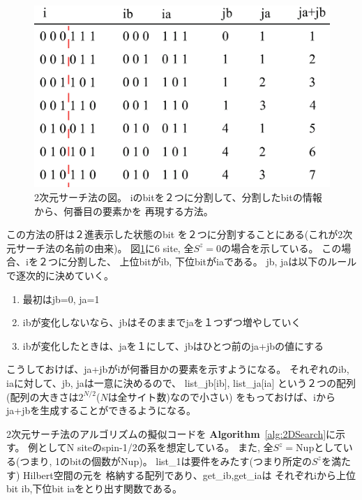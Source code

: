 \documentclass[prb,aps,showpacs,preprint,nofootinbib]{revtex4}
\begin{document}
\begin{figure}[h!]
        \begin{center}
                \includegraphics[width=12cm,clip]{2DSearch.eps}
        \end{center}
\caption{2次元サーチ法の図。
iのbitを２つに分割して、分割したbitの情報から、何番目の要素かを
再現する方法。}
\label{fig:2DSearch}
\end{figure}


この方法の肝は２進表示した状態のbit
を２つに分割することにある(これが2次元サーチ法の名前の由来)。
図\ref{fig:2DSearch}に6 site, 全$S^{z}=0$の場合を示している。
この場合、iを２つに分割した、
上位bitがib, 下位bitがiaである。
jb, jaは以下のルールで逐次的に決めていく。
\begin{enumerate}
\item 最初はjb=0, ja=1
\item ibが変化しないなら、jbはそのままでjaを１つずつ増やしていく
\item ibが変化したときは、jaを１にして、jbはひとつ前のja+jbの値にする
\end{enumerate}
こうしておけば、ja+jbがiが何番目かの要素を示すようになる。
それぞれのib, iaに対して、jb, jaは一意に決めるので、
list\_jb[ib], list\_ja[ia]
という２つの配列(配列の大きさは$2^{N/2}$($N$は全サイト数)なので小さい)
をもっておけば、iからja+jbを生成することができるようになる。

2次元サーチ法のアルゴリズムの擬似コードを
{\bf Algorithm}~\ref{alg:2DSearch}に示す。
例としてN siteのspin-1/2の系を想定している。
また, 全$S^z=$Nupとしている(つまり, 1のbitの個数がNup)。
list\_1は要件をみたす(つまり所定の$S^{z}$を満たす)
Hilbert空間の元を
格納する配列であり、get\_ib,get\_iaは
それぞれiから上位bit ib,下位bit iaをとり出す関数である。
\end{document}
